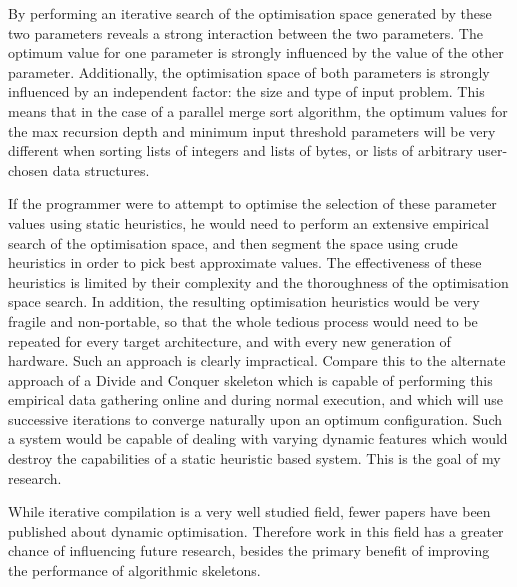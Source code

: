 By performing an iterative search of the optimisation space generated
by these two parameters reveals a strong interaction between the two
parameters. The optimum value for one parameter is strongly influenced
by the value of the other parameter. Additionally, the optimisation
space of both parameters is strongly influenced by an independent
factor: the size and type of input problem. This means that in the
case of a parallel merge sort algorithm, the optimum values for the
max recursion depth and minimum input threshold parameters will be
very different when sorting lists of integers and lists of bytes, or
lists of arbitrary user-chosen data structures.

If the programmer were to attempt to optimise the selection of these
parameter values using static heuristics, he would need to perform an
extensive empirical search of the optimisation space, and then segment
the space using crude heuristics in order to pick best approximate
values. The effectiveness of these heuristics is limited by their
complexity and the thoroughness of the optimisation space search. In
addition, the resulting optimisation heuristics would be very fragile
and non-portable, so that the whole tedious process would need to be
repeated for every target architecture, and with every new generation
of hardware. Such an approach is clearly impractical. Compare this to
the alternate approach of a Divide and Conquer skeleton which is
capable of performing this empirical data gathering online and during
normal execution, and which will use successive iterations to converge
naturally upon an optimum configuration. Such a system would be
capable of dealing with varying dynamic features which would destroy
the capabilities of a static heuristic based system. This is the goal
of my research.


While iterative compilation is a very well studied field, fewer papers
have been published about dynamic optimisation. Therefore work in this
field has a greater chance of influencing future research, besides the
primary benefit of improving the performance of algorithmic skeletons.

